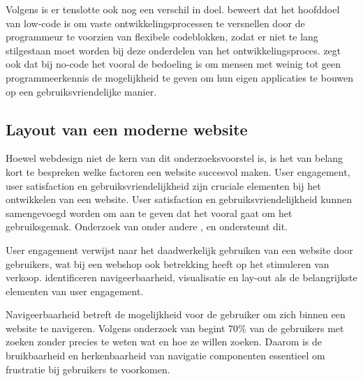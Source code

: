 \vspace{\baselineskip}

Volgens \textcite{ICE2022} is er tenslotte ook nog een verschil in doel. \textcite{ICE2022} beweert dat het hoofddoel van low-code is om vaste ontwikkelingsprocessen te versnellen door de programmeur te voorzien van flexibele codeblokken, zodat er niet te lang stilgestaan moet worden bij deze onderdelen van het ontwikkelingsproces. \textcite{ICE2022} zegt ook dat bij no-code het vooral de bedoeling is om mensen met weinig tot geen programmeerkennis de mogelijkheid te geven om hun eigen applicaties te bouwen op een gebruiksvriendelijke manier.

\subsection{Layout van een moderne website}
\label{sec:Layout van een moderne website}

Hoewel webdesign niet de kern van dit onderzoeksvoorstel is, is het van belang kort te bespreken welke factoren een website succesvol maken. User engagement, user satisfaction en gebruiksvriendelijkheid zijn cruciale elementen bij het ontwikkelen van een website. User satisfaction en gebruiksvriendelijkheid kunnen samengevoegd worden om aan te geven dat het vooral gaat om het gebruiksgemak. Onderzoek van onder andere \textcite{vila2021indicators}, \textcite{saoula2023building} en \textcite{flavian2009web} ondersteunt dit.

\vspace{\baselineskip}

User engagement verwijst naar het daadwerkelijk gebruiken van een website door gebruikers, wat bij een webshop ook betrekking heeft op het stimuleren van verkoop. \textcite{garett2016literature} identificeren navigeerbaarheid, visualisatie en lay-out als de belangrijkste elementen van user engagement.

\vspace{\baselineskip}

Navigeerbaarheid betreft de mogelijkheid voor de gebruiker om zich binnen een website te navigeren. Volgens onderzoek van \textcite{vila2021indicators} begint 70\% van de gebruikers met zoeken zonder precies te weten wat en hoe ze willen zoeken. Daarom is de bruikbaarheid en herkenbaarheid van navigatie componenten essentieel om frustratie bij gebruikers te voorkomen.

\vspace{\baselineskip}

